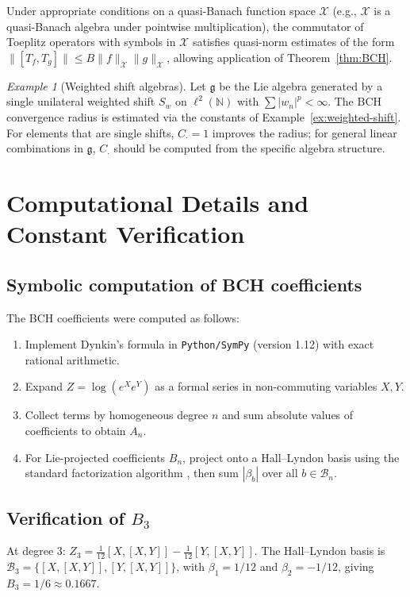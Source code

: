 \documentclass[10pt]{amsart}
\theoremstyle{definition}
\theoremstyle{remark}
\newtheorem{example}[theorem]{Example}
\numberwithin{equation}{section}
\newcommand{\Cmult}{C_{\cdot}}       %
\newcommand{\Cbracket}{B}            %
\begin{document}
Under appropriate conditions on a quasi-Banach function space $\mathcal{X}$ (e.g.,
$\mathcal{X}$ is a quasi-Banach algebra under pointwise multiplication), the commutator of
Toeplitz operators with symbols in $\mathcal{X}$ satisfies quasi-norm estimates of the
form $\|[T_f,T_g]\| \le \Cbracket \|f\|_{\mathcal{X}}\|g\|_{\mathcal{X}}$, allowing
application of Theorem~\ref{thm:BCH}.

\begin{example}[Weighted shift algebras]
Let $\mathfrak{g}$ be the Lie algebra generated by a single unilateral weighted shift
$S_w$ on $\ell^2(\mathbb{N})$ with $\sum |w_n|^p < \infty$.  The BCH convergence radius
is estimated via the constants of Example~\ref{ex:weighted-shift}.  For elements that are
single shifts, $\Cmult = 1$ improves the radius; for general linear combinations in
$\mathfrak{g}$, $\Cmult$ should be computed from the specific algebra structure.
\end{example}

\appendix

\section{Computational Details and Constant Verification}

\subsection{Symbolic computation of BCH coefficients}

The BCH coefficients were computed as follows:
\begin{enumerate}
    \item Implement Dynkin's formula in \texttt{Python/SymPy} (version 1.12) with exact
          rational arithmetic.
    \item Expand $Z = \log(e^X e^Y)$ as a formal series in non-commuting variables $X,Y$.
    \item Collect terms by homogeneous degree $n$ and sum absolute values of coefficients
          to obtain $A_n$.
    \item For Lie-projected coefficients $B_n$, project onto a Hall--Lyndon basis using
          the standard factorization algorithm \cite{Reutenauer1993}, then sum $|\beta_b|$
          over all $b\in\mathcal{B}_n$.
\end{enumerate}

\subsection{Verification of \texorpdfstring{$B_3$}{B3}}
At degree 3: $Z_3 = \frac{1}{12}[X,[X,Y]] - \frac{1}{12}[Y,[X,Y]]$.  The Hall--Lyndon
basis is $\mathcal{B}_3 = \{[X,[X,Y]], [Y,[X,Y]]\}$, with $\beta_1 = 1/12$ and
$\beta_2 = -1/12$, giving $B_3 = 1/6 \approx 0.1667$.
\end{document}

